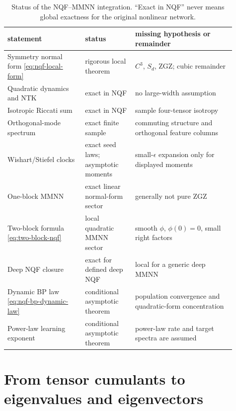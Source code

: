\documentclass{article}
\begin{document}
\begin{table}[t]
\centering
\caption{Status of the NQF--MMNN integration.  ``Exact in NQF'' never means
global exactness for the original nonlinear network.}
\label{tab:nqf-status}
\small
\begin{tabular}{p{0.31\linewidth}p{0.20\linewidth}p{0.40\linewidth}}
\toprule
statement & status & missing hypothesis or remainder\\
\midrule
Symmetry normal form \eqref{eq:nqf-local-form} & rigorous local theorem &
\(C^3\), \(S_d\), ZGZ; cubic remainder\\
Quadratic dynamics and NTK & exact in NQF & no large-width assumption\\
Isotropic Riccati sum & exact in NQF & sample four-tensor isotropy\\
Orthogonal-mode spectrum & exact finite sample & commuting structure and
orthogonal feature columns\\
Wishart/Stiefel clocks & exact seed laws; asymptotic moments &
small-\(\epsilon\) expansion only for displayed moments\\
One-block MMNN & exact linear normal-form sector & generally not pure ZGZ\\
Two-block formula \eqref{eq:two-block-nqf} & local quadratic MMNN sector &
smooth \(\phi\), \(\phi(0)=0\), small right factors\\
Deep NQF closure & exact for defined deep NQF & local for a generic deep MMNN\\
Dynamic BP law \eqref{eq:nqf-bp-dynamic-law} & conditional asymptotic theorem &
population convergence and quadratic-form concentration\\
Power-law learning exponent & conditional asymptotic theorem &
power-law rate and target spectra are assumed\\
\bottomrule
\end{tabular}
\end{table}

\section{From tensor cumulants to eigenvalues and eigenvectors}
\label{sec:spectral}
\end{document}
